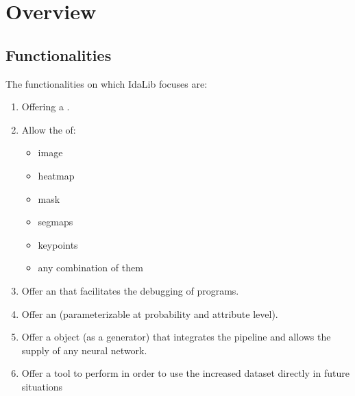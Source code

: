 \documentclass[letterpaper,10pt,english]{sphinxmanual}
\begin{document}
\section{Overview}
\label{\detokenize{overview:overview}}\label{\detokenize{overview::doc}}

\subsection{Functionalities}
\label{\detokenize{overview:functionalities}}
The functionalities on which IdaLib focuses are:
\begin{enumerate}
%
\item {} 
Offering a .

\item {} 
Allow the   of:
\begin{itemize}
\item {} 
image

\item {} 
heatmap

\item {} 
mask

\item {} 
segmaps

\item {} 
keypoints

\item {} 
any combination of them

\end{itemize}

\item {} 
Offer an  that facilitates the debugging of programs.

\item {} 
Offer an  (parameterizable at probability and attribute level).

\item {} 
Offer a  object (as a generator) that integrates the pipeline and allows the supply of any neural network.

\item {} 
Offer a tool to perform  in order to use the increased dataset directly in future situations

\end{enumerate}
\end{document}
